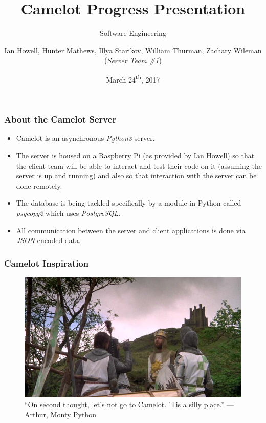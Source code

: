 \documentclass{beamer}
\title{Camelot Progress Presentation}
\subtitle{Software Engineering}
\author{Ian Howell, Hunter Mathews, Illya Starikov, William Thurman, Zachary Wileman (\textit{Server Team \#1})}
\date{March 24\textsuperscript{th}, 2017}
\institute{Missouri University of Science and Technology}
\begin{document}
\begin{frame}
    \vfill
    \centering
\end{frame}


\begin{frame}
    \maketitle
\end{frame}


\begin{frame}
    \frametitle{About the Camelot Server}
    \begin{itemize}
        \item Camelot is an asynchronous \textit{Python3} server.
        \item The server is housed on a Raspberry Pi (as provided by Ian Howell) so that the client team will be able to interact and test their code on it (assuming the server is up and running) and also so that interaction with the server can be done remotely.
        \item The database is being tackled specifically by a module in Python called \textit{psycopg2} which uses \textit{PostgreSQL}.
        \item All communication between the server and client applications is done via \textit{JSON} encoded data.
    \end{itemize}
\end{frame}


\begin{frame}
    \frametitle{Camelot Inspiration}

    \begin{figure}
        \centering
        \includegraphics[width=\textwidth]{images/camelot}
        \caption{``On second thought, let's not go to Camelot. 'Tis a silly place.'' — Arthur, Monty Python}
        \label{fig:camelot}
    \end{figure}
\end{frame}
\end{document}
